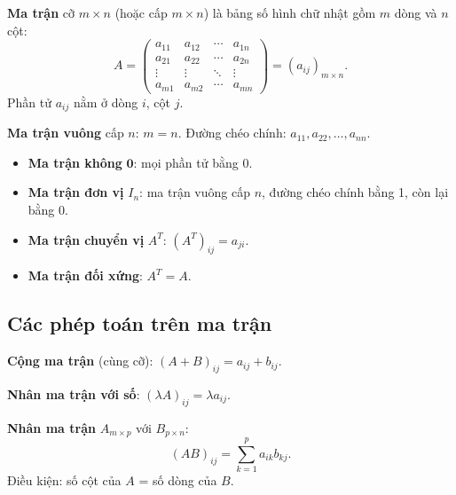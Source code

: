 \documentclass[12pt,a4paper]{article}
\begin{document}
\begin{dinhnghia}
  \textbf{Ma trận} cỡ $m \times n$ (hoặc cấp $m \times n$) là bảng số hình chữ nhật gồm $m$ dòng và $n$ cột:
  \[
    A = \begin{pmatrix}
      a_{11} & a_{12} & \cdots & a_{1n} \\
      a_{21} & a_{22} & \cdots & a_{2n} \\
      \vdots & \vdots & \ddots & \vdots \\
      a_{m1} & a_{m2} & \cdots & a_{mn}
    \end{pmatrix} = (a_{ij})_{m \times n}.
  \]
  Phần tử $a_{ij}$ nằm ở dòng $i$, cột $j$.
\end{dinhnghia}

\begin{dinhnghia}
  \textbf{Ma trận vuông} cấp $n$: $m = n$. Đường chéo chính: $a_{11}, a_{22}, \ldots, a_{nn}$.
\end{dinhnghia}

\begin{tinhchat}[title={Các loại ma trận đặc biệt}]
  \begin{itemize}
    \item \textbf{Ma trận không} $\mathbf{0}$: mọi phần tử bằng 0.
    \item \textbf{Ma trận đơn vị} $I_n$: ma trận vuông cấp $n$, đường chéo chính bằng 1, còn lại bằng 0.
    \item \textbf{Ma trận chuyển vị} $A^T$: $(A^T)_{ij} = a_{ji}$.
    \item \textbf{Ma trận đối xứng}: $A^T = A$.
  \end{itemize}
\end{tinhchat}

\subsection{Các phép toán trên ma trận}

\begin{dinhnghia}
  \textbf{Cộng ma trận} (cùng cỡ): $(A + B)_{ij} = a_{ij} + b_{ij}$.
\end{dinhnghia}

\begin{dinhnghia}
  \textbf{Nhân ma trận với số}: $(\lambda A)_{ij} = \lambda a_{ij}$.
\end{dinhnghia}

\begin{dinhnghia}
  \textbf{Nhân ma trận} $A_{m \times p}$ với $B_{p \times n}$:
  \[
    (AB)_{ij} = \sum_{k=1}^{p} a_{ik} b_{kj}.
  \]
  Điều kiện: số cột của $A$ = số dòng của $B$.
\end{dinhnghia}
\end{document}
